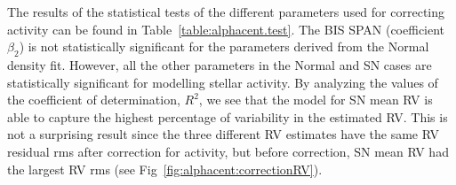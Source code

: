 \documentclass{aa}
\def\cms{\hbox{\,cm\,s$^{-1}$}}       %
\begin{document}

The results of the statistical tests of the different parameters used for correcting activity can be found in Table~\ref{table:alphacent.test}.  The BIS SPAN (coefficient $\beta_2$) is not statistically significant for the parameters derived from the Normal density fit. 
However, all the other parameters in the Normal and SN cases are statistically significant for modelling stellar activity. 
By analyzing the values of the coefficient of determination, $R^2$, we see that the model for SN mean RV is able to capture the highest percentage of variability in the estimated RV. 
This is not a surprising result since the three different RV estimates have the same RV residual rms after correction for activity, but before correction, SN mean RV had the largest RV rms (see Fig~\ref{fig:alphacent:correctionRV}).
\end{document}
